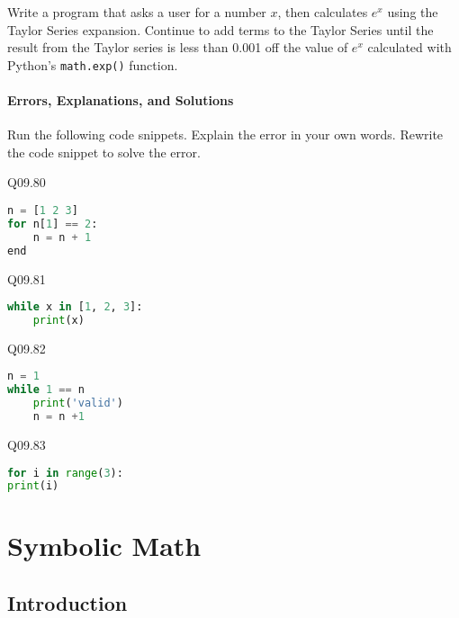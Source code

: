\documentclass{book}
\newcommand{\passthrough}[1]{#1}
\begin{document}
Write a program that asks a user for a number \(x\), then calculates
\(e^x\) using the Taylor Series expansion. Continue to add terms to the
Taylor Series until the result from the Taylor series is less than 0.001
off the value of \(e^x\) calculated with Python's
\passthrough{\lstinline!math.exp()!} function.
    




    
        \hypertarget{errors-explanations-and-solutions}{%
\subsubsection{Errors, Explanations, and
Solutions}\label{errors-explanations-and-solutions}}

Run the following code snippets. Explain the error in your own words.
Rewrite the code snippet to solve the error.
    




    
        Q09.80

\begin{lstlisting}[language=Python]
n = [1 2 3]
for n[1] == 2:
    n = n + 1
end
\end{lstlisting}

Q09.81

\begin{lstlisting}[language=Python]
while x in [1, 2, 3]:
    print(x)
\end{lstlisting}

Q09.82

\begin{lstlisting}[language=Python]
n = 1
while 1 == n
    print('valid')
    n = n +1
\end{lstlisting}

Q09.83

\begin{lstlisting}[language=Python]
for i in range(3):
print(i)
\end{lstlisting}
    




    
        \hypertarget{symbolic-math}{%
\chapter{Symbolic Math}\label{symbolic-math}}
    




    
        \hypertarget{introduction}{%
\section{Introduction}\label{introduction}}
    
\end{document}
